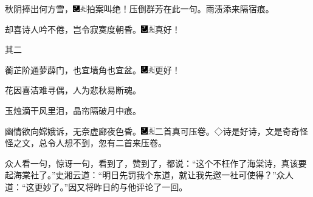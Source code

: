 秋阴捧出何方雪，{\includegraphics[width=3mm]{../Images/00003}\includegraphics[width=3mm]{../Images/00012}\footnotesize \kaishu 拍案叫绝！压倒群芳在此一句。}雨渍添来隔宿痕。

却喜诗人吟不倦，岂令寂寞度朝昏。{\includegraphics[width=3mm]{../Images/00003}\includegraphics[width=3mm]{../Images/00012}\footnotesize \kaishu 真好！}

其二

蘅芷阶通萝薜门，也宜墙角也宜盆。{\includegraphics[width=3mm]{../Images/00003}\includegraphics[width=3mm]{../Images/00012}\footnotesize \kaishu 更好！}

花因喜洁难寻偶，人为悲秋易断魂。

玉烛滴干风里泪，晶帘隔破月中痕。

幽情欲向嫦娥诉，无奈虚廊夜色昏。{\includegraphics[width=3mm]{../Images/00003}\includegraphics[width=3mm]{../Images/00012}\footnotesize \kaishu 二首真可压卷。◇诗是好诗，文是奇奇怪怪之文，总令人想不到，忽有二首来压卷。}

众人看一句，惊讶一句，看到了，赞到了，都说：``这个不枉作了海棠诗，真该要起海棠社了。''史湘云道：``明日先罚我个东道，就让我先邀一社可使得？''众人道：``这更妙了。''因又将昨日的与他评论了一回。


